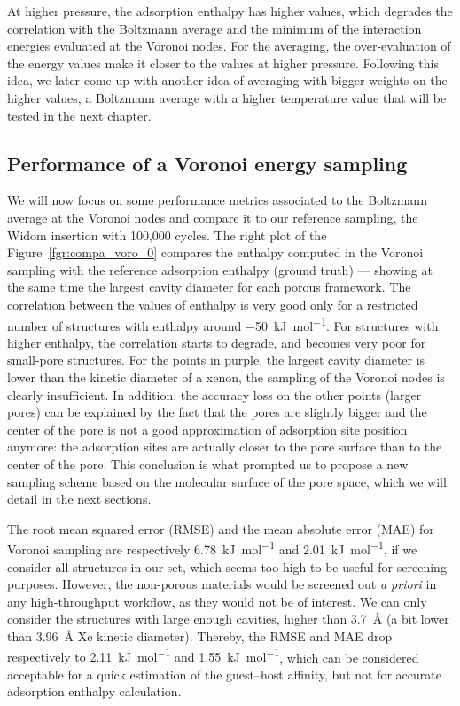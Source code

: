 \documentclass[main]{subfiles}
\begin{document}
At higher pressure, the adsorption enthalpy has higher values, which degrades the correlation with the Boltzmann average and the minimum of the interaction energies evaluated at the Voronoi nodes. For the averaging, the over-evaluation of the energy values make it closer to the values at higher pressure. Following this idea, we later come up with another idea of averaging with bigger weights on the higher values, a Boltzmann average with a higher temperature value that will be tested in the next chapter. 

\subsection{Performance of a Voronoi energy sampling}

We will now focus on some performance metrics associated to the Boltzmann average at the Voronoi nodes and compare it to our reference sampling, the Widom insertion with 100,000 cycles. The right plot of the Figure~\ref{fgr:compa_voro_0} compares the enthalpy computed in the Voronoi sampling with the reference adsorption enthalpy (ground truth) --- showing at the same time the largest cavity diameter for each porous framework. The correlation between the values of enthalpy is very good only for a restricted number of structures with enthalpy around \SI{-50}{\kilo\joule\per\mole}. For structures with higher enthalpy, the correlation starts to degrade, and becomes very poor for small-pore structures. For the points in purple, the largest cavity diameter is lower than the kinetic diameter of a xenon, the sampling of the Voronoi nodes is clearly insufficient. In addition, the accuracy loss on the other points (larger pores) can be explained by the fact that the pores are slightly bigger and the center of the pore is not a good approximation of adsorption site position anymore: the adsorption sites are actually closer to the pore surface than to the center of the pore. This conclusion is what prompted us to propose a new sampling scheme based on the molecular surface of the pore space, which we will detail in the next sections.

The root mean squared error (RMSE) {and the mean absolute error (MAE) for Voronoi sampling are respectively \SI{6.78}{\kilo\joule\per\mole} and \SI{2.01}{\kilo\joule\per\mole}}, if we consider all structures in our set, which seems too high to be useful for screening purposes. However, the non-porous materials would be screened out \emph{a priori} in any high-throughput workflow, as they would not be of interest. We can only consider the structures with large enough cavities, higher than \SI{3.7}{\angstrom} (a bit lower than \SI{3.96}{\angstrom} Xe kinetic diameter). Thereby, {the RMSE and MAE drop respectively to \SI{2.11}{\kilo\joule\per\mole} and \SI{1.55}{\kilo\joule\per\mole}}, which can be considered acceptable for a quick estimation of the guest--host affinity, but not for accurate adsorption enthalpy calculation.
\end{document}
